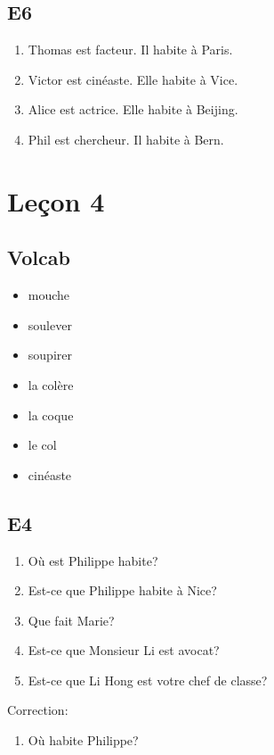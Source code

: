 \documentclass{book}
\begin{document}
    \section{E6}
        \begin{enumerate}
            \item Thomas est facteur. Il habite à Paris.
            \item Victor est cinéaste. Elle habite à Vice.
            \item Alice est actrice. Elle habite à Beijing.
            \item Phil est chercheur. Il habite à Bern.
        \end{enumerate}

\chapter{Leçon 4}
    \section{Volcab}
        \begin{itemize}
            \item mouche
            \item soulever
            \item soupirer
            \item la colère
            \item la coque
            \item le col
            \item cinéaste
        \end{itemize}
        
    \section{E4}
        \begin{enumerate}
            \item Où est Philippe habite?
            \item Est-ce que Philippe habite à Nice?
            \item Que fait Marie?
            \item Est-ce que Monsieur Li est avocat?
            \item Est-ce que Li Hong est votre chef de classe?
        \end{enumerate}
        Correction:
        \begin{enumerate}
            \item Où habite Philippe?
        \end{enumerate}
\end{document}
